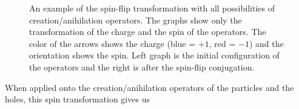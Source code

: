 \begin{figure}
\begin{center}
  \end{center}
  \caption{An example of the spin-flip transformation with all possibilities of creation/anihilation operators. The graphs show only the transformation of the charge and the spin of the operators. The color of the arrows shows the charge (blue = $+1$, red = $-1$) and the orientation shows the spin. Left graph is the initial configuration of the operators and the right is after the spin-flip conjugation.}
  \label{fig:spin-flip}
\end{figure}

When applied onto the creation/anihilation operators of the particles and the holes, this spin transformation gives us

